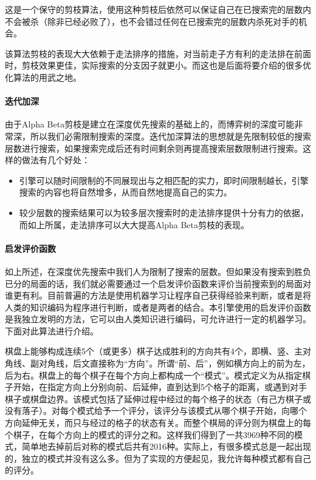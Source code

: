 \documentclass{ctexart}
\begin{document}
这是一个保守的剪枝算法，使用这种剪枝后依然可以保证自己在已搜索完的层数内不会被杀（除非已经必败了），也不会错过任何在已搜索完的层数内杀死对手的机会。

该算法剪枝的表现大大依赖于走法排序的措施，对当前走子方有利的走法排在前面时，剪枝效果更佳，实际搜索的分支因子就更小。而这也是后面将要介绍的很多优化算法的用武之地。

\paragraph{迭代加深} 由于Alpha Beta剪枝是建立在深度优先搜索的基础上的，而博弈树的深度可能非常深，所以我们必需限制搜索的深度。迭代加深算法的思想就是先限制较低的搜索层数进行搜索，如果搜索完成后还有时间剩余则再提高搜索层数限制进行搜索。这样的做法有几个好处：
\begin{itemize}
    \item 引擎可以随时间限制的不同展现出与之相匹配的实力，即时间限制越长，引擎搜索的内容也将自然增多，从而自然地提高自己的实力。
    \item 较少层数的搜索结果可以为较多层次搜索时的走法排序提供十分有力的依据，而如上所属，走法排序可以大大提高Alpha Beta剪枝的表现。
\end{itemize}

\paragraph{启发评价函数} 如上所述，在深度优先搜索中我们人为限制了搜索的层数。但如果没有搜索到胜负已分的局面的话，我们就必需要通过一个启发评价函数来评价当前搜索到的局面对谁更有利。目前普遍的方法是使用机器学习让程序自己获得经验来判断，或者是将人类的知识编码为程序进行判断，或者是两者的结合。本引擎使用的启发评价函数是我独立发明的方法，它可以由人类知识进行编码，可允许进行一定的机器学习。下面对此算法进行介绍。

棋盘上能够构成连续5个（或更多）棋子达成胜利的方向共有4个，即横、竖、主对角线、副对角线，后文直接称为“方向”。所谓“前、后”，例如横方向上的前为左，后为右。棋盘上的每个棋子在每个方向上都构成一个“模式”。模式定义为从指定棋子开始，在指定方向上分别向前、后延伸，直到达到5个格子的距离，或遇到对手棋子或棋盘边界。该模式包括了延伸过程中经过的每个格子的状态（有己方棋子或没有落子）。对每个模式给予一个评分，该评分与该模式从哪个棋子开始，向哪个方向延伸无关，而只与经过的格子的状态有关。而整个棋局的评分则为棋盘上的每个棋子，在每个方向上的模式的评分之和。这样我们得到了一共3969种不同的模式，简单地去掉前后对称的模式后共有2016种。实际上，有很多模式总是一起出现的，独立的模式并没有这么多。但为了实现的方便起见，我允许每种模式都有自己的评分。
\end{document}
